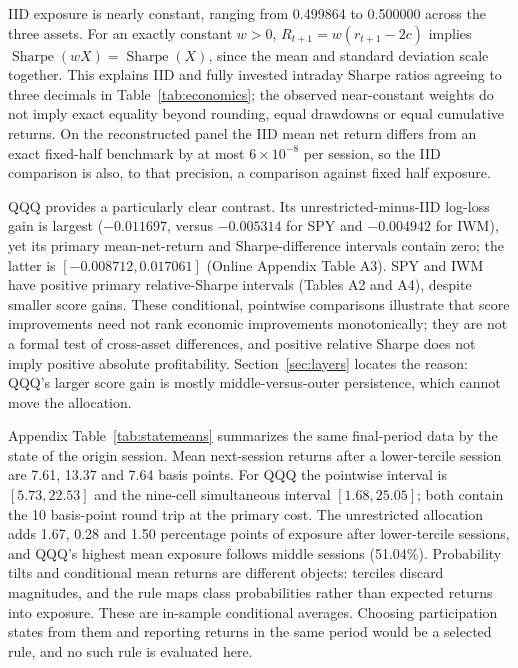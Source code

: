 IID exposure is nearly constant, ranging from 0.499864 to 0.500000 across the three assets. For an exactly constant $w>0$, $R_{t+1}=w(r_{t+1}-2c)$ implies $\operatorname{Sharpe}(wX)=\operatorname{Sharpe}(X)$, since the mean and standard deviation scale together. This explains IID and fully invested intraday Sharpe ratios agreeing to three decimals in Table~\ref{tab:economics}; the observed near-constant weights do not imply exact equality beyond rounding, equal drawdowns or equal cumulative returns. On the reconstructed panel the IID mean net return differs from an exact fixed-half benchmark by at most $6\times10^{-8}$ per session, so the IID comparison is also, to that precision, a comparison against fixed half exposure.

QQQ provides a particularly clear contrast. Its unrestricted-minus-IID log-loss gain is largest ($-0.011697$, versus $-0.005314$ for SPY and $-0.004942$ for IWM), yet its primary mean-net-return and Sharpe-difference intervals contain zero; the latter is $[-0.008712,0.017061]$ (Online Appendix Table A3). SPY and IWM have positive primary relative-Sharpe intervals (Tables A2 and A4), despite smaller score gains. These conditional, pointwise comparisons illustrate that score improvements need not rank economic improvements monotonically; they are not a formal test of cross-asset differences, and positive relative Sharpe does not imply positive absolute profitability. Section~\ref{sec:layers} locates the reason: QQQ's larger score gain is mostly middle-versus-outer persistence, which cannot move the allocation.

Appendix Table~\ref{tab:statemeans} summarizes the same final-period data by the state of the origin session. Mean next-session returns after a lower-tercile session are 7.61, 13.37 and 7.64 basis points. For QQQ the pointwise interval is $[5.73,22.53]$ and the nine-cell simultaneous interval $[1.68,25.05]$; both contain the 10 basis-point round trip at the primary cost. The unrestricted allocation adds 1.67, 0.28 and 1.50 percentage points of exposure after lower-tercile sessions, and QQQ's highest mean exposure follows middle sessions (51.04\%). Probability tilts and conditional mean returns are different objects: terciles discard magnitudes, and the rule maps class probabilities rather than expected returns into exposure. These are in-sample conditional averages. Choosing participation states from them and reporting returns in the same period would be a selected rule, and no such rule is evaluated here.

